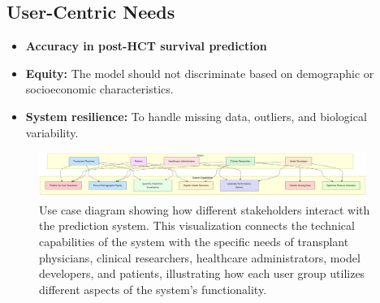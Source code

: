 \subsection{User-Centric Needs}

\begin{itemize}
    \item \textbf{Accuracy in post-HCT survival prediction}
    
    \item \textbf{Equity:} The model should not discriminate based on demographic or socioeconomic characteristics.
    
    \item \textbf{System resilience:} To handle missing data, outliers, and biological variability.
\end{itemize}

\begin{figure}[H]
    \centering
    \includegraphics[width=0.95\textwidth]{figures/UseCaseDiagram.png}
    \caption{Use case diagram showing how different stakeholders interact with the prediction system. This visualization connects the technical capabilities of the system with the specific needs of transplant physicians, clinical researchers, healthcare administrators, model developers, and patients, illustrating how each user group utilizes different aspects of the system's functionality.}
    \label{fig:use_case_diagram}
\end{figure}


